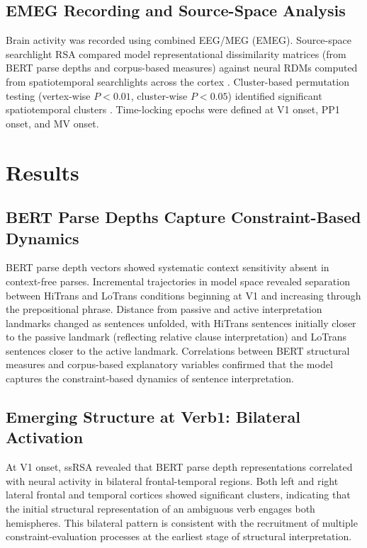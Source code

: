 \documentclass[12pt]{article}
\begin{document}
\subsection{EMEG Recording and Source-Space Analysis}

Brain activity was recorded using combined EEG/MEG (EMEG). Source-space searchlight RSA compared model representational dissimilarity matrices (from BERT parse depths and corpus-based measures) against neural RDMs computed from spatiotemporal searchlights across the cortex \citep{kriegeskorte2008rsa}. Cluster-based permutation testing (vertex-wise $P < 0.01$, cluster-wise $P < 0.05$) identified significant spatiotemporal clusters \citep{maris2007nonparametric}. Time-locking epochs were defined at V1 onset, PP1 onset, and MV onset.

\section{Results}

\subsection{BERT Parse Depths Capture Constraint-Based Dynamics}

BERT parse depth vectors showed systematic context sensitivity absent in context-free parses. Incremental trajectories in model space revealed separation between HiTrans and LoTrans conditions beginning at V1 and increasing through the prepositional phrase. Distance from passive and active interpretation landmarks changed as sentences unfolded, with HiTrans sentences initially closer to the passive landmark (reflecting relative clause interpretation) and LoTrans sentences closer to the active landmark. Correlations between BERT structural measures and corpus-based explanatory variables confirmed that the model captures the constraint-based dynamics of sentence interpretation.

\subsection{Emerging Structure at Verb1: Bilateral Activation}

At V1 onset, ssRSA revealed that BERT parse depth representations correlated with neural activity in bilateral frontal-temporal regions. Both left and right lateral frontal and temporal cortices showed significant clusters, indicating that the initial structural representation of an ambiguous verb engages both hemispheres. This bilateral pattern is consistent with the recruitment of multiple constraint-evaluation processes at the earliest stage of structural interpretation.
\end{document}
